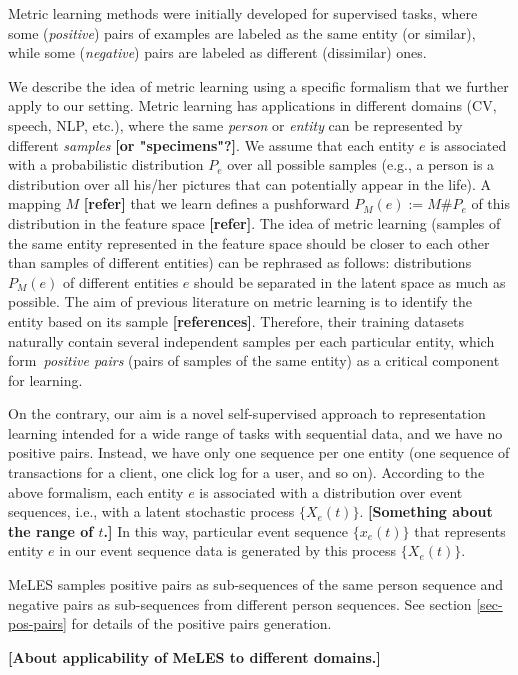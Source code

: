 \documentclass{article}
\newcommand{\nt}[1]{{\bf [#1]}}
\begin{document}
Metric learning methods were initially developed for supervised tasks, where some (\textit{positive}) pairs of examples are labeled as the same entity (or similar), while some (\textit{negative}) pairs are labeled as different (dissimilar) ones.

We describe the idea of metric learning using a specific formalism that we further apply to our setting. Metric learning has applications in different domains (CV, speech, NLP, etc.), where the same \textit{person} or \textit{entity} can be represented by different \textit{samples} 
\nt{or "specimens"?}. We assume that each entity $e$ is associated with a probabilistic distribution $P_e$ over all possible samples (e.g., a person is a distribution over all his/her pictures that can potentially appear in the life). A mapping $M$ \nt{refer} that we learn defines a pushforward $P_M(e):=M\#P_e$ of this distribution in the feature space \nt{refer}. The idea of metric learning (samples of the same entity represented in the feature space should be closer to each other than samples of different entities) can be rephrased as follows: distributions $P_M(e)$ of different entities $e$ should be separated in the latent space as much as possible. The aim of previous literature on metric learning is to identify the entity based on its sample \nt{references}. Therefore, their training datasets naturally contain several independent samples per each particular entity, which form~\textit{positive pairs} (pairs of samples of the same entity) as a critical component for learning.

On the contrary, our aim is a novel self-supervised approach to representation learning intended for a wide range of tasks with sequential data, and we have no positive pairs. Instead, we have only one sequence per one entity (one sequence of transactions for a client, one click log for a user, and so on). According to the above formalism, each entity $e$ is associated with a distribution over event sequences, i.e., with a latent stochastic process $\{X_e(t)\}$. \nt{Something about the range of $t$.} In this way, particular event sequence $\{x_e(t)\}$ that represents entity $e$ in our event sequence data is generated by this process $\{X_e(t)\}$.

MeLES samples positive pairs as sub-sequences of the same person sequence and negative pairs as sub-sequences from different person sequences. See section \ref{sec-pos-pairs} for details of the positive pairs generation.

\nt{About applicability of MeLES to different domains.}
\end{document}
